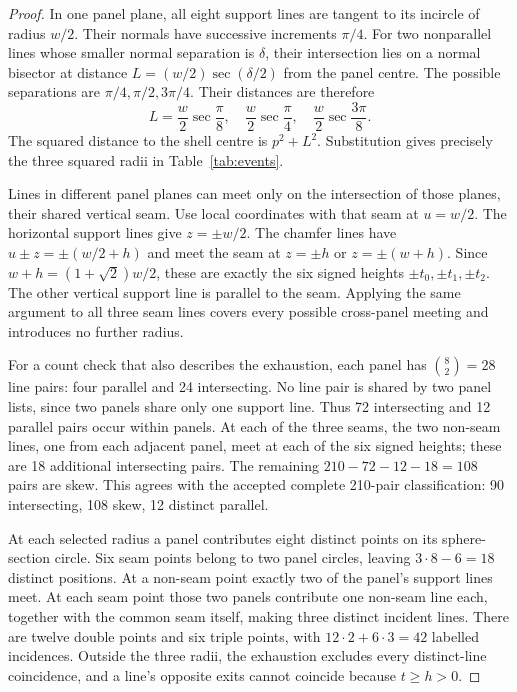 \documentclass[11pt,a4paper]{article}
\begin{document}
\begin{proof}
In one panel plane, all eight support lines are tangent to its incircle of radius $w/2$. Their normals have successive increments $\pi/4$. For two nonparallel lines whose smaller normal separation is $\delta$, their intersection lies on a normal bisector at distance $L=(w/2)\sec(\delta/2)$ from the panel centre. The possible separations are $\pi/4,\pi/2,3\pi/4$. Their distances are therefore
\begin{equation}\label{eq:paneldist}
L=\frac w2\sec\frac\pi8,\quad \frac w2\sec\frac\pi4,\quad
\frac w2\sec\frac{3\pi}8.
\end{equation}
The squared distance to the shell centre is $p^2+L^2$. Substitution gives precisely the three squared radii in Table~\ref{tab:events}.

Lines in different panel planes can meet only on the intersection of those planes, their shared vertical seam. Use local coordinates with that seam at $u=w/2$. The horizontal support lines give $z=\pm w/2$. The chamfer lines have $u\pm z=\pm(w/2+h)$ and meet the seam at $z=\pm h$ or $z=\pm(w+h)$. Since $w+h=(1+\sqrt2)w/2$, these are exactly the six signed heights $\pm t_0,\pm t_1,\pm t_2$. The other vertical support line is parallel to the seam. Applying the same argument to all three seam lines covers every possible cross-panel meeting and introduces no further radius.

For a count check that also describes the exhaustion, each panel has $\binom82=28$ line pairs: four parallel and 24 intersecting. No line pair is shared by two panel lists, since two panels share only one support line. Thus 72 intersecting and 12 parallel pairs occur within panels. At each of the three seams, the two non-seam lines, one from each adjacent panel, meet at each of the six signed heights; these are 18 additional intersecting pairs. The remaining $210-72-12-18=108$ pairs are skew. This agrees with the accepted complete 210-pair classification: 90 intersecting, 108 skew, 12 distinct parallel.

At each selected radius a panel contributes eight distinct points on its sphere-section circle. Six seam points belong to two panel circles, leaving $3\cdot8-6=18$ distinct positions. At a non-seam point exactly two of the panel's support lines meet. At each seam point those two panels contribute one non-seam line each, together with the common seam itself, making three distinct incident lines. There are twelve double points and six triple points, with $12\cdot2+6\cdot3=42$ labelled incidences. Outside the three radii, the exhaustion excludes every distinct-line coincidence, and a line's opposite exits cannot coincide because $t\geq h>0$.
\end{proof}
\end{document}
